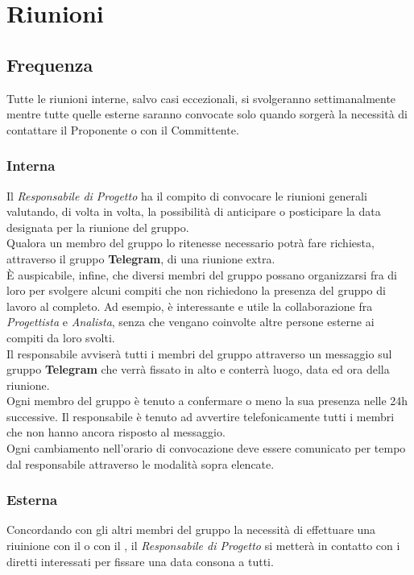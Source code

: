 \section{Riunioni}
  \subsection{Frequenza}
    Tutte le riunioni interne, salvo casi eccezionali, si svolgeranno settimanalmente mentre tutte quelle esterne saranno convocate solo quando sorgerà la necessità di contattare il Proponente o con il Committente.

    \subsubsection{Interna}
      Il \emph{Responsabile di Progetto} ha il compito di convocare le riunioni generali valutando, di volta in volta, la possibilità di anticipare o posticipare la data
      designata per la riunione del gruppo.\\
      Qualora un membro del gruppo lo ritenesse necessario potrà fare richiesta, attraverso il gruppo \textbf{Telegram}, di una riunione extra.\\
      È auspicabile, infine, che diversi membri del gruppo possano organizzarsi fra di loro per svolgere alcuni compiti che non richiedono la presenza  del gruppo di lavoro
      al completo. Ad esempio, è interessante e utile la collaborazione fra \emph{Progettista} e \emph{Analista}, senza che vengano coinvolte altre persone esterne ai compiti
      da loro svolti.\\
      Il responsabile avviserà tutti i membri del gruppo attraverso un messaggio sul gruppo \textbf{Telegram} che verrà fissato in alto e conterrà luogo, data ed ora della riunione.\\
      Ogni membro del gruppo è tenuto a confermare o meno la sua presenza nelle 24h successive. Il responsabile è tenuto ad avvertire telefonicamente tutti i membri che
      non hanno ancora risposto al messaggio.\\
      Ogni cambiamento nell'orario di convocazione deve essere comunicato per tempo dal responsabile attraverso le modalità sopra elencate.
    \subsubsection{Esterna}
      Concordando con gli altri membri del gruppo la necessità di effettuare una riuinione con il  o con il , il \emph{Responsabile di Progetto}
      si metterà in contatto con i diretti interessati per fissare una data consona a tutti.
